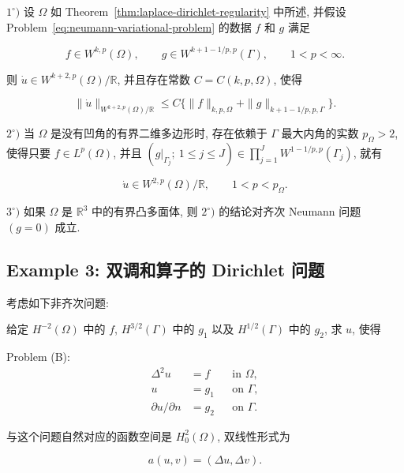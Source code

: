 \setcounter{statement}{9}
\renewcommand{\theHstatement}{theorem.\thesection.\arabic{statement}}
\begin{Theorem}\label{thm:laplace-neumann-regularity}
$1^\circ)$ 设 $\Omega$ 如 Theorem~\ref{thm:laplace-dirichlet-regularity} 中所述, 并假设
Problem~\eqref{eq:neumann-variational-problem} 的数据 $f$ 和 $g$ 满足

\[
f\in W^{k,p}(\Omega),\qquad g\in W^{k+1-1/p,p}(\Gamma),\qquad1<p<\infty.
\]

则 $\dot u\in W^{k+2,p}(\Omega)/\mathbb R$, 并且存在常数 $C=C(k,p,\Omega)$, 使得

\begin{equation}\label{eq:neumann-regularity-wkp}
\|\dot u\|_{W^{k+2,p}(\Omega)/\mathbb R}\leq C\{\|f\|_{k,p,\Omega}+\|g\|_{k+1-1/p,p,\Gamma}\}.
\end{equation}

$2^\circ)$ 当 $\Omega$ 是没有凹角的有界二维多边形时, 存在依赖于 $\Gamma$ 最大内角的实数 $p_\Omega>2$, 使得只要 $f\in L^p(\Omega)$, 并且 $(g|_{\Gamma_j};\ 1\leq j\leq J)\in\prod_{j=1}^J W^{1-1/p,p}(\Gamma_j)$, 就有

\[
\dot u\in W^{2,p}(\Omega)/\mathbb R,\qquad1<p<p_\Omega.
\]

$3^\circ)$ 如果 $\Omega$ 是 $\mathbb R^3$ 中的有界凸多面体, 则 $2^\circ)$ 的结论对齐次 Neumann 问题 $(g=0)$ 成立.
\end{Theorem}

\subsection{Example 3: 双调和算子的 Dirichlet 问题}\label{subsec:biharmonic-dirichlet-example}

考虑如下非齐次问题:

给定 $H^{-2}(\Omega)$ 中的 $f$, $H^{3/2}(\Gamma)$ 中的 $g_1$ 以及 $H^{1/2}(\Gamma)$ 中的 $g_2$, 求 $u$, 使得

\noindent Problem (B):
\begin{align}
\Delta^2u&=f&&\text{in }\Omega,\label{eq:biharmonic-equation}\\
u&=g_1&&\text{on }\Gamma,\label{eq:biharmonic-dirichlet-boundary}\\
\partial u/\partial n&=g_2&&\text{on }\Gamma.\label{eq:biharmonic-normal-boundary}
\end{align}

与这个问题自然对应的函数空间是 $H_0^2(\Omega)$, 双线性形式为

\[
a(u,v)=(\Delta u,\Delta v).
\]

